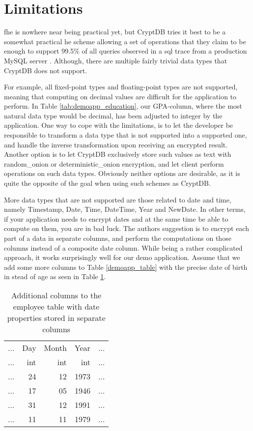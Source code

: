 \section{Limitations}

\gls{fhe} is nowhere near being practical yet, but CryptDB tries it best to be a somewhat practical \gls{he} scheme allowing a set of operations that they claim to be enough to support 99.5\% of all queries observed in a \gls{sql} trace from a production MySQL server \citep{CryptDB_Main_Paper}. Although, there are multiple fairly trivial data types that CryptDB does not support.

For example, all fixed-point types and floating-point types are not supported, meaning that computing on decimal values are difficult for the application to perform. In Table \ref{tab:demoapp_education}, our GPA-column, where the most natural data type would be decimal, has been adjusted to integer by the application. One way to cope with the limitations, is to let the developer be responsible to transform a data type that is not supported into a supported one, and handle the inverse transformation  upon receiving an encrypted result. Another option is to let CryptDB exclusively store such values as text with \gls{random_onion} or \gls{deterministic_onion} encryption, and let client perform operations on such data types. Obviously neither options are desirable, as it is quite the opposite of the goal when using such schemes as CryptDB. 

More data types that are not supported are those related to date and time, namely Timestamp, Date, Time, DateTime, Year and NewDate. In other terms, if your application needs to encrypt dates and at the same time be able to compute on them, you are in bad luck. The authors suggestion is to encrypt each part of a data in separate columns, and perform the computations on those columns instead of a composite date column. While being a rather complicated approach, it works surprisingly well for our demo application. Assume that we add some more columns to Table \ref{demoapp_table} with the precise date of birth in stead of age as seen in Table \ref{tab:empl_tab_mod}.

\begin{table}[H]
\centering
\begin{tabular}{| c | r | r | r | c |}
\hline
  ... & Day & Month & Year & ... \\
  ... & int & int & int & ... \\
 \hline \hline
 ... & 24 & 12 & 1973  & ... \\
 ... & 17 & 05 & 1946 & ... \\
 ... & 31 & 12 & 1991 & ... \\
 ... & 11 & 11 & 1979  & ... \\
 \hline
\end{tabular}
\caption{Additional columns to the employee table with date properties stored in separate columns}
\label{tab:empl_tab_mod}
\end{table}


